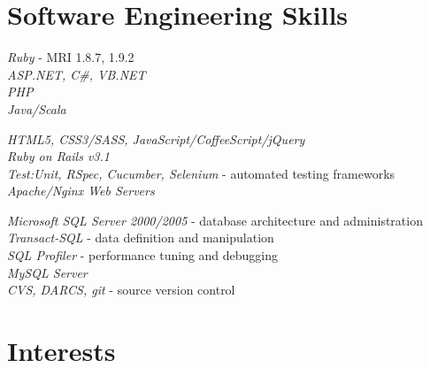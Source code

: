 \documentclass[10pt]{article} %
\begin{document}

\section{Software Engineering Skills}

{
\textit{Ruby} - MRI 1.8.7, 1.9.2\\
\textit{ASP.NET, C\#, VB.NET}\\
\textit{PHP}\\
\textit{Java/Scala}
}


{
\textit{HTML5, CSS3/SASS, JavaScript/CoffeeScript/jQuery}\\
\textit{Ruby on Rails v3.1}\\
\textit{Test:Unit, RSpec, Cucumber, Selenium} - automated testing frameworks\\
\textit{Apache/Nginx Web Servers}\\
}


{
\textit{Microsoft SQL Server 2000/2005} - database architecture and administration\\
\textit{Transact-SQL} - data definition and manipulation\\
\textit{SQL Profiler} - performance tuning and debugging\\
\textit{MySQL Server}\\
\textit{CVS, DARCS, git} - source version control
}


\section{Interests}


\end{document}
